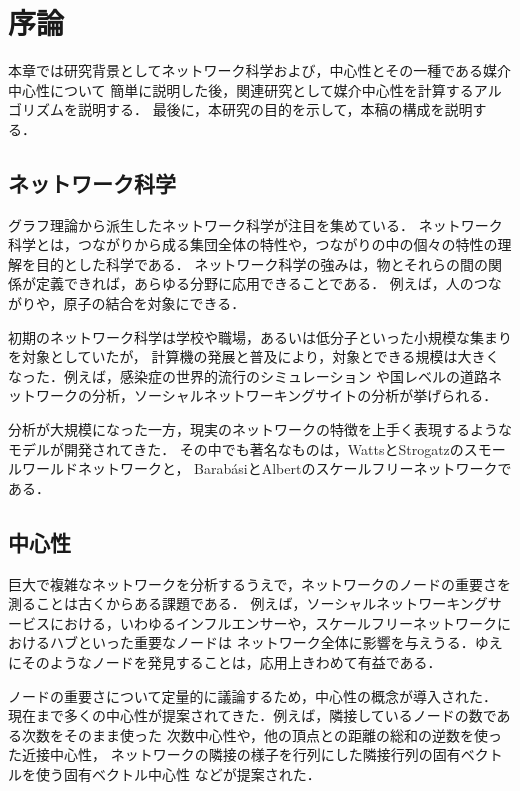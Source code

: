 \chapter{序論}
\label{chap:introduction}

本章では研究背景としてネットワーク科学および，中心性とその一種である媒介中心性について
簡単に説明した後，関連研究として媒介中心性を計算するアルゴリズムを説明する．
最後に，本研究の目的を示して，本稿の構成を説明する．

\section{ネットワーク科学}

グラフ理論から派生したネットワーク科学が注目を集めている．
ネットワーク科学とは，つながりから成る集団全体の特性や，つながりの中の個々の特性の理解を目的とした科学である．
ネットワーク科学の強みは，物とそれらの間の関係が定義できれば，あらゆる分野に応用できることである．
例えば，人のつながりや，原子の結合を対象にできる．

初期のネットワーク科学は学校や職場，あるいは低分子といった小規模な集まりを対象としていたが，
計算機の発展と普及により，対象とできる規模は大きくなった．例えば，感染症の世界的流行のシミュレーション
や国レベルの道路ネットワークの分析，ソーシャルネットワーキングサイトの分析が挙げられる．

分析が大規模になった一方，現実のネットワークの特徴を上手く表現するようなモデルが開発されてきた．
その中でも著名なものは，WattsとStrogatzのスモールワールドネットワーク\cite{Watts1998}と，
Barab{\'{a}}siとAlbertのスケールフリーネットワーク\cite{Barabasi1999}である．

\section{中心性}

巨大で複雑なネットワークを分析するうえで，ネットワークのノードの重要さを測ることは古くからある課題である．
例えば，ソーシャルネットワーキングサービスにおける，いわゆるインフルエンサーや，スケールフリーネットワークにおけるハブといった重要なノードは
ネットワーク全体に影響を与えうる．ゆえにそのようなノードを発見することは，応用上きわめて有益である．

ノードの重要さについて定量的に議論するため，中心性の概念が導入された．
現在まで多くの中心性が提案されてきた．例えば，隣接しているノードの数である次数をそのまま使った
次数中心性や，他の頂点との距離の総和の逆数を使った近接中心性\cite{Beauchamp1965}，
ネットワークの隣接の様子を行列にした隣接行列の固有ベクトルを使う固有ベクトル中心性
\cite{Bonacich1991}などが提案された．

